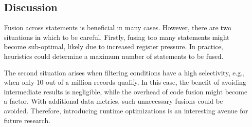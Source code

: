 



\subsection{Discussion}

Fusion across statements is beneficial in many cases. However, there
are two situations in which to be careful. Firstly,
fusing too many statements might become sub-optimal, likely due to increased
register pressure. In practice, heuristics could determine a maximum number of statements to be fused.

The second situation arises when filtering conditions have a high selectivity,
e.g., when only 10 out of a million records qualify. In this case, the benefit of
avoiding intermediate results is negligible, while the overhead of code fusion
might become a factor. 
With additional data metrics, such unnecessary fusions
could be avoided. Therefore, introducing runtime optimizations is an interesting avenue for future research.
